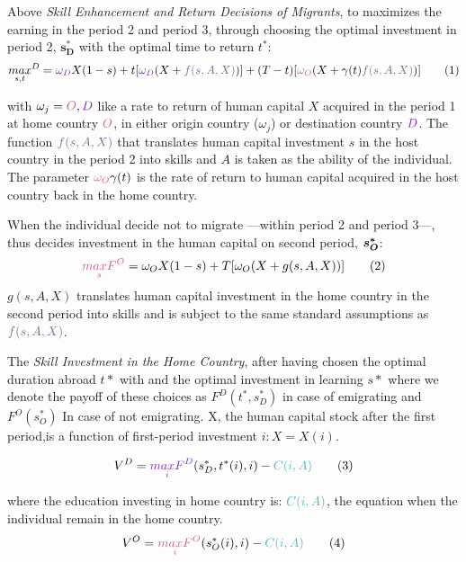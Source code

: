 \documentclass[11pt]{article}
\theoremstyle{prop}
\begin{document}
	Above \textit{Skill Enhancement and Return Decisions of Migrants}, to maximizes the earning in the  {\color{BlueG}period 2} and {\color{BlueG}period 3}, through choosing the optimal investment in {\color{BlueG}period 2}, $\bm{s^*_D}$ with the optimal time to return $t^*$: 
	\begin{equation}			
	\underset{s,t}{max}^D= {\color{purple}{\omega_D}} X(1-s)+t[{\color{purple}{\omega_D}} (X+ {\color{gray} f(s,A,X)} )] + (T-t)[ {\color{pink}{\omega_O}} (X+\gamma (t) {\color{gray} f(s,A,X)})]  
	\tag{1}
	\end{equation} 

 	with $\omega_j= {\color{pink}O},{\color{purple}D}$ like a rate to return of human capital $X$ acquired in the {\color{BlueG}period 1} at home country ${\color{pink}O}$,  in either origin country ($\omega_j$) or destination country ${\color{purple}D}$. The function ${\color{gray} f(s,A,X)}$ that translates human capital investment $s$ in the host country in the {\color{BlueG} period 2} into skills and $A$ is taken as the ability of the individual.
 	The parameter ${\color{pink} \omega_O}\gamma(t)$ is the rate of return to human capital acquired in the host country back in the home country.
 	
	When the individual decide not to migrate ---within {\color{BlueG}period 2} and {\color{BlueG}period 3}---, thus decides investment in the human capital on second period, $\hm{s^{*}_O}$:
	\begin{equation}
	{\color{pink} \underset{s}{maxF}^O}=\omega_OX(1-s) + T [\omega_O(X+g(s,A,X))]         \tag{2}
	\end{equation}
	$g(s,A,X)$ translates human capital investment in the home country in the second period into skills and is subject to the same standard assumptions as ${\color{gray} f(s,A,X)}$.
	
	The \textit{Skill Investment in the Home Country}, after having chosen the optimal duration abroad $t*$ with and the optimal investment in learning $s*$ where we denote the payoff of these choices as $F^D(t^*,s^*_D)$ in case of emigrating and $F^O(s^*_O)$ In case of not emigrating. X, the human capital stock after the first period,is a function of first-period investment $i:X =X(i)$.
	
	\begin{equation}
		V^D={\color{purple} \underset{i}{maxF}^D}(s^{*}_D, t^*(i), i)- {\color{skyblue} C(i,A)}      \tag{3}
	\end{equation}	
	
	where the education investing in home country is: ${\color{skyblue} C(i,A)}$, the equation when the individual remain in the home country.
	\begin{equation}
		V^O={\color{pink} \underset{i}{maxF}^O}(s^{*}_O(i), i)- {\color{skyblue} C(i,A)}           \tag{4}
	\end{equation}	
\end{document}
